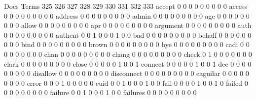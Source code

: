 \documentclass[compress,8pt]{beamer}
\begin{document}
\begin{frame}
\begin{Schunk}
                                          Docs
Terms                                      325 326 327 328 329 330 331 332 333
  accept                                     0   0   0   0   0   0   0   0   0
  access                                     0   0   0   0   0   0   0   0   0
  address                                    0   0   0   0   0   0   0   0   0
  admin                                      0   0   0   0   0   0   0   0   0
  age                                        0   0   0   0   0   0   0   0   0
  allow                                      0   0   0   0   0   0   0   0   0
  apr                                        0   0   0   0   0   0   0   0   0
  argument                                   0   0   0   0   0   0   0   0   0
  auth                                       0   0   0   0   0   0   0   0   0
  authent                                    0   0   1   0   0   0   1   0   0
  bad                                        0   0   0   0   0   0   0   0   0
  behalf                                     0   0   0   0   0   0   0   0   0
  bind                                       0   0   0   0   0   0   0   0   0
  brown                                      0   0   0   0   0   0   0   0   0
  bye                                        0   0   0   0   0   0   0   0   0
  cadi                                       0   0   0   0   0   0   0   0   0
  chan                                       0   0   0   0   0   0   0   0   0
  chang                                      0   0   0   0   0   0   0   0   0
  check                                      0   1   0   0   0   0   0   0   0
  clark                                      0   0   0   0   0   0   0   0   0
  close                                      0   0   0   0   0   1   0   0   1
  connect                                    0   0   0   0   0   1   0   0   1
  dec                                        0   0   0   0   0   0   0   0   0
  disallow                                   0   0   0   0   0   0   0   0   0
  disconnect                                 0   0   0   0   0   0   0   0   0
  eaguilar                                   0   0   0   0   0   0   0   0   0
  error                                      0   0   0   1   0   0   0   0   0
  euid                                       0   0   1   0   0   0   1   0   0
  fail                                       0   0   0   0   1   0   0   1   0
  failed                                     0   0   0   0   0   0   0   0   0
  failure                                    0   0   1   0   0   0   1   0   0
  failures                                   0   0   0   0   0   0   0   0   0

\end{Schunk}
\end{frame}
\end{document}
